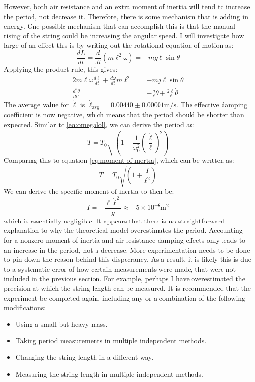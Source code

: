 \documentclass[%
 reprint,
 amsmath,amssymb
 aps,
]{revtex4-2}
\begin{document}
However, both air resistance and an extra moment of inertia will tend to increase the period, not decrease it. Therefore, there is some mechanism that is adding in energy. One possible mechanism that can accomplish this is that the manual rising of the string could be increasing the angular speed. I will investigate how large of an effect this is by writing out the rotational equation of motion as:
\begin{equation}
    \frac{dL}{dt} = \frac{d}{dt}\left(m \ell^2 \omega\right) = -mg\ell\sin\theta
    \label{eq:}
\end{equation}
Applying the product rule, this gives:
\begin{align}
    2m\ell\omega \frac{d\ell}{dt} + \frac{d\omega}{dt}m\ell^2 &= -mg\ell\sin\theta \\ 
    \frac{d^2\theta}{dt^2} &= -\frac{g}{\ell}\theta + \frac{2\dot{\ell}}{\ell}\dot{\theta}
    \label{eq:}
\end{align}
The average value for $\dot{\ell}$ is $\dot{\ell}_\text{avg}=0.00440 \pm 0.00001 \si{\meter\per\second}$. The effective damping coefficient is now negative, which means that the period should be shorter than expected. Similar to \ref{eq:omegalol}, we can derive the period as:
\begin{equation}
    T = T_0\sqrt{\left(1-\frac{1}{\omega_0^2}\left(\frac{\dot{\ell}}{\ell}\right)^2\right)}
    \label{eq:}
\end{equation}
Comparing this to equation \ref{eq:moment of inertia}, which can be written as:
\begin{equation}
    T = T_0\sqrt{\left(1+\frac{I}{\ell^2}\right)}
    \label{eq:}
\end{equation}
We can derive the specific moment of inertia to then be:
\begin{equation}
    I = -\frac{\ell \dot{\ell}^2}{g} \approx -5 \times 10^{-6} \si{\meter\squared}
    \label{eq:}
\end{equation}
which is essentially negligible. It appears that there is no straightforward explanation to why the theoretical model overestimates the period. Accounting for a nonzero moment of inertia and air resistance damping effects only leads to an increase in the period, not a decrease. More experimentation needs to be done to pin down the reason behind this dispecrancy. As a result, it is likely this is due to a systematic error of how certain measurements were made, that were not included in the previous section. For example, perhaps I have overestimated the precision at which the string length can be measured. It is recommended that the experiment be completed again, including any or a combination of the following modifications:
\begin{itemize}
    \item Using a small but heavy mass.
    \item Taking period measurements in multiple independent methods.
    \item Changing the string length in a different way.
    \item Measuring the string length in multiple independent methods.
\end{itemize}
\end{document}
